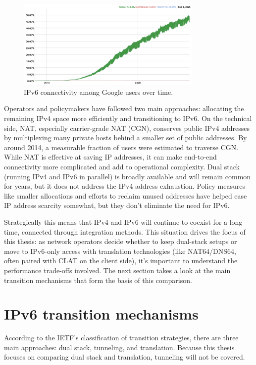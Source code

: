 \begin{figure}[H]
    \centering
    \caption{IPv6 connectivity among Google users over time\cite{google_ipv6_statistics}.}
    \label{fig:ipv6_google_adoption}
    \includegraphics[width=0.8\textwidth]{resources/images/ipv6google}
\end{figure}

Operators and policymakers have followed two main approaches: allocating the remaining IPv4 space more efficiently and transitioning to IPv6\cite{LEVIN20141059}. On the technical side, NAT, especially carrier-grade NAT (CGN), conserves public IPv4 addresses by multiplexing many private hosts behind a smaller set of public addresses\cite{rfc2663}. By around 2014, a measurable fraction of users were estimated to traverse CGN\cite{livadariu2018inferring}. While NAT is effective at saving IP addresses, it can make end-to-end connectivity more complicated and add to operational complexity\cite{rfc2993}. 
Dual stack (running IPv4 and IPv6 in parallel) is broadly available and will remain common for years, but it does not address the IPv4 address exhaustion\cite{LEVIN20141059}. Policy measures like smaller allocations and efforts to reclaim unused addresses have helped ease IP address scarcity somewhat, but they don't eliminate the need for IPv6\cite{LEVIN20141059}.

Strategically this means that IPv4 and IPv6 will continue to coexist for a long time, connected through integration methods\cite{7737362,LEVIN20141059}. This situation drives the focus of this thesis: as network operators decide whether to keep dual-stack setups or move to IPv6-only access with translation technologies (like NAT64/DNS64, often paired with CLAT on the client side), it's important to understand the performance trade-offs involved. The next section takes a look at the main transition mechanisms that form the basis of this comparison\cite{7737362,LEVIN20141059}.

\section{IPv6 transition mechanisms}
According to the IETF’s classification of transition strategies, there are three main approaches: 
dual stack, tunneling, and translation\cite{rfc2893}. Because this thesis focuses on comparing dual stack and translation, tunneling will not be covered. 

